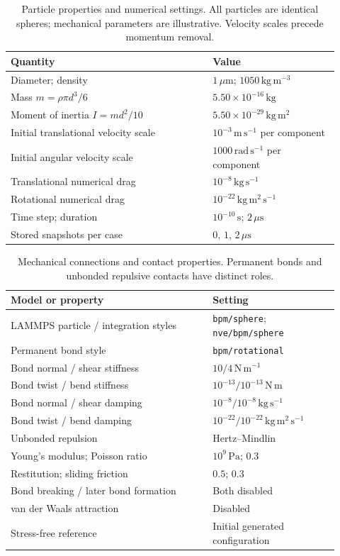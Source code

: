 \begin{table}[htbp]
\centering\small
\caption{Particle properties and numerical settings. All particles are identical spheres; mechanical parameters are illustrative. Velocity scales precede momentum removal.}\label{tab:particles}
\begin{tabular}{@{}p{0.57\linewidth}p{0.35\linewidth}@{}}\toprule
Quantity & Value\\\midrule
Diameter; density & $1\,\mu\mathrm{m}$; $1050\,\mathrm{kg\,m^{-3}}$\\
Mass $m=\rho\pi d^3/6$ & $5.50\times10^{-16}\,\mathrm{kg}$\\
Moment of inertia $I=md^2/10$ & $5.50\times10^{-29}\,\mathrm{kg\,m^2}$\\
Initial translational velocity scale & $10^{-3}\,\mathrm{m\,s^{-1}}$ per component\\
Initial angular velocity scale & $1000\,\mathrm{rad\,s^{-1}}$ per component\\
Translational numerical drag & $10^{-8}\,\mathrm{kg\,s^{-1}}$\\
Rotational numerical drag & $10^{-22}\,\mathrm{kg\,m^2\,s^{-1}}$\\
Time step; duration & $10^{-10}\,\mathrm{s}$; $2\,\mu\mathrm{s}$\\
Stored snapshots per case & $0$, $1$, $2\,\mu\mathrm{s}$\\\bottomrule
\end{tabular}
\end{table}
\begin{table}[htbp]
\centering\small
\caption{Mechanical connections and contact properties. Permanent bonds and unbonded repulsive contacts have distinct roles.}\label{tab:contacts}
\begin{tabular}{@{}p{0.57\linewidth}p{0.35\linewidth}@{}}\toprule
Model or property & Setting\\\midrule
LAMMPS particle / integration styles & \texttt{bpm/sphere}; \texttt{nve/bpm/sphere}\\
Permanent bond style & \texttt{bpm/rotational}\\
Bond normal / shear stiffness & $10 / 4\,\mathrm{N\,m^{-1}}$\\
Bond twist / bend stiffness & $10^{-13} / 10^{-13}\,\mathrm{N\,m}$\\
Bond normal / shear damping & $10^{-8} / 10^{-8}\,\mathrm{kg\,s^{-1}}$\\
Bond twist / bend damping & $10^{-22} / 10^{-22}\,\mathrm{kg\,m^2\,s^{-1}}$\\
Unbonded repulsion & Hertz--Mindlin\\
Young's modulus; Poisson ratio & $10^9\,\mathrm{Pa}$; $0.3$\\
Restitution; sliding friction & $0.5$; $0.3$\\
Bond breaking / later bond formation & Both disabled\\
van der Waals attraction & Disabled\\
Stress-free reference & Initial generated configuration\\\bottomrule
\end{tabular}
\end{table}
